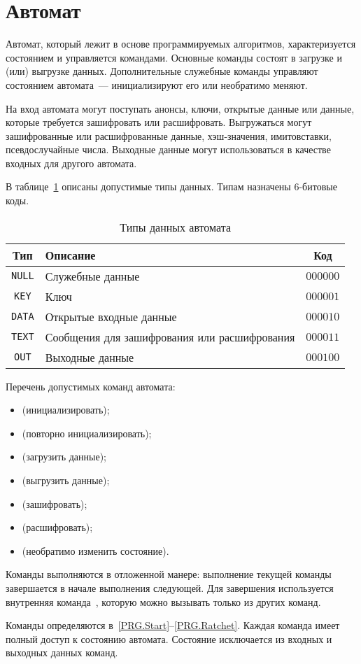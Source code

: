 \section{Автомат}\label{PRG.Auto}

Автомат, который лежит в основе программируемых алгоритмов, 
характеризуется состоянием и управляется командами.
%
Основные команды состоят в загрузке и (или) выгрузке данных.
Дополнительные служебные команды управляют состоянием автомата~---
инициализируют его или необратимо меняют.

На вход автомата могут поступать анонсы, ключи, 
открытые данные или данные, которые требуется зашифровать или расшифровать. 
%
Выгружаться могут зашифрованные или расшифрованные данные, хэш-значения, 
имитовставки, псевдослучайные числа. Выходные данные могут использоваться в 
качестве входных для другого автомата.

В таблице~\ref{Table.PRG.InOut} описаны допустимые типы данных. 
Типам назначены $6$-битовые коды.

\begin{table}[thb]
\caption{Типы данных автомата}\label{Table.PRG.InOut}
\begin{tabular}{|c|l|c|}
\hline
Тип & Описание & Код\\
\hline
\hline
\texttt{NULL} & Служебные данные & 
$000000$\\
%
\texttt{KEY} & Ключ & 
$000001$\\
%
\texttt{DATA} & Открытые входные данные & 
$000010$\\
%
\texttt{TEXT} & Сообщения для зашифрования или расшифрования & 
$000011$\\
%
\texttt{OUT} & Выходные данные & 
$000100$\\
\hline
\end{tabular}
\end{table}

Перечень допустимых команд автомата:
\begin{itemize}
\item
{} (инициализировать);
\item
{} (повторно инициализировать);
\item
{} (загрузить данные);
\item
{} (выгрузить данные);
\item
{} (зашифровать);
\item
{} (расшифровать);
\item
{} (необратимо изменить состояние).
\end{itemize}

Команды выполняются в отложенной манере: выполнение текущей 
команды завершается в начале выполнения следующей.
Для завершения используется внутренняя команда~, 
которую можно вызывать только из других команд.

Команды определяются в~\ref{PRG.Start}--\ref{PRG.Ratchet}.
%
Каждая команда имеет полный доступ к состоянию автомата.
Состояние исключается из входных и выходных данных команд.

